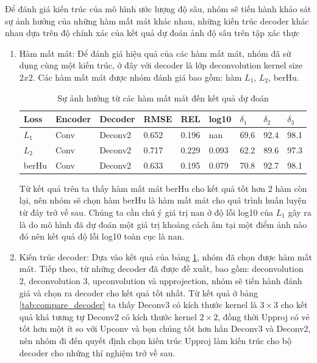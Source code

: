 Để đánh giá kiến trúc của mô hình ước lượng độ sâu, nhóm sẽ tiến hành khảo sát sự ảnh hưởng của những hàm mất mát khác nhau, những kiến trúc decoder khác nhau dựa trên độ chính xác của kết quả dự đoán ảnh độ sâu trên tập xác thực

\begin{enumerate}
\item Hàm mất mát: Để đánh giá hiệu quả của các hàm mất mát, nhóm đã sử dụng cùng một kiến trúc, ở đây với decoder là lớp deconvolution kernel size $2x2$. Các hàm mất mát được nhóm đánh giá bao gồm: hàm $L_1$, $L_2$, berHu.
\begin{table}[H]
\centering
\begin{tabular}{ |p{1.5cm}|p{1.5cm}|p{1.5cm}|p{1cm}|p{1cm}|p{1cm}|p{1cm}|p{1cm}|p{1cm}|}
\hline
Loss & Encoder &  Decoder & RMSE &  REL & log10 & $\delta_1$ & $\delta_2$ & $\delta_3$ \\
\hline
$L_1$ & Conv & Deconv2 & 0.652 & 0.196 & nan & 69.6 & 92.4 & 98.1 \\
\hline
$L_2$ & Conv &  Deconv2  & 0.717 & 0.229 & 0.093 & 62.2 & 89.6 & 97.3\\
\hline
berHu & Conv & Deconv2 & 0.633 & 0.195 & 0.079 & 70.8 & 92.7 & 98.1 \\
\hline
\end{tabular}
\caption{Sự ảnh hưởng từ các hàm mất mát đến kết quả dự đoán}
\label{tab:compare_loss}
\end{table}
Từ kết quả trên ta thấy hàm mất mát berHu cho kết quả tốt hơn 2 hàm còn lại, nên nhóm sẽ chọn hàm berHu là hàm mất mát cho quá trình huấn luyện từ đây trở về sau. Chúng ta cần chú ý giá trị nan ở độ lỗi log10 của $L_1$ gây ra là do mô hình đã dự đoán một giá trị khoảng cách âm tại một điểm ảnh nào đó nên kết quả độ lỗi log10 toàn cục là nan.
\item Kiến trúc decoder: Dựa vào kết quả của bảng \ref{tab:compare_loss}, nhóm đã chọn được hàm mất mát. Tiếp theo, từ những decoder đã được đề xuất, bao gồm: deconvolution 2, deconvolution 3, upconvolution và upprojection, nhóm sẽ tiến hành đánh giá và chọn ra decoder cho kết quả tốt nhất. Từ kết quả ở bảng \ref{tab:compare_decoder} ta thấy Deconv3 có kích thước kernel là $3\times3$ cho kết quả khá tương tự Deconv2 có kích thước kernel $2\times2$, đồng thời Upproj có vẻ tốt hơn một ít so với Upconv và bọn chúng tốt hơn hẳn Deconv3 và Deconv2, nên nhóm đi đến quyết định chọn kiến trúc Upproj làm kiến trúc cho bộ decoder cho những thí nghiệm trở về sau.


\end{enumerate}
